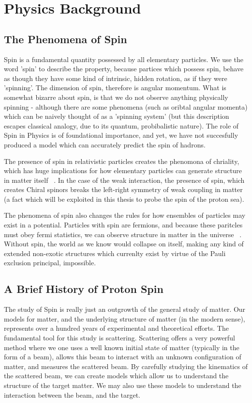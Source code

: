 \chapter{Physics Background}
\section{The Phenomena of Spin}

Spin is a fundamental quantity possessed by all elementary particles. We use
the word 'spin' to describe the property, because partices which possess spin,
behave as though they have some kind of intrinsic, hidden rotation, as if they
were 'spinning'. The dimension of spin, therefore is angular momentum. What is
somewhat bizarre about spin, is that we do not observe anything physically
spinning - although there are some phenomena (such as oribtal angular momenta)
which can be naively thought of as a 'spinning system' (but this description
escapes classical analogy, due to its quantum, probibalistic nature). The role
of Spin in Physics is of foundational importance, and yet, we have not
succesfully produced a model which can accurately predict the spin of hadrons.

The presence of spin in relativistic particles creates the phenomona of
chriality, which has huge implications for how elementary particles can generate
structure in matter itself ~\needcite{}. In the case of the weak interaction,
the presence of spin, which creates Chiral spinors breaks the left-right
symmetry of weak coupling in matter (a fact which will be exploited in this
thesis to probe the spin of the proton sea).

The phenomena of spin also changes the rules for how ensembles of particles may
exist in a potential. Particles with spin are fermions, and because these
paritcles must obey fermi statistics, we can observe structure in matter in the
universe ~\needcite{}. Without spin, the world as we know would collapse on
itself, making any kind of extended non-exotic structures which currenlty exist
by virtue of the Pauli exclusion principal, impossible.

\section{A Brief History of Proton Spin}

The study of Spin is really just an outgrowth of the general study of matter.
Our models for matter, and the underlying structure of matter (in the modern
sense), represents over a hundred years of experimental and theoretical efforts.
The fundamental tool for this study is scattering. Scattering offers a very
powerful method where we one uses a well known initial state of matter
(typically in the form of a beam), allows this beam to interact with an unknown
configuration of matter, and measures the scattered beam. By carefully studying
the kinematics of the scattered beam, we can create models which allow us to
understand the structure of the target matter. We may also use these models to
understand the interaction between the beam, and the target. 

